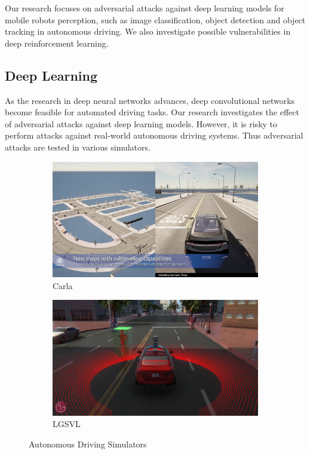 Our research focuses on adversarial attacks against deep learning models for mobile robots perception, such as image classification, object detection and object tracking in autonomous driving. We also investigate possible vulnerabilities in deep reinforcement learning.


\subsection{Deep Learning}
\label{sec:deep_robot}

As the research in deep neural networks advances, deep convolutional networks become feasible for automated driving tasks. Our research investigates the effect of adversarial attacks against deep learning models. However, it is risky to perform attacks against real-world autonomous driving systems. Thus adversarial attacks are tested in various simulators.

\begin{figure}[H]
\centering
\begin{subfigure}[b]{0.485\textwidth}
    \centering
    \includegraphics[width=\textwidth]{figures/chapter_intro/carla.jpg}
    \caption{Carla}
    \label{fig:carla}
\end{subfigure}
\hfill
\begin{subfigure}[b]{0.485\textwidth}
    \centering
    \includegraphics[width=\textwidth]{figures/chapter_intro/lgsvl.png}
    \caption{LGSVL}
    \label{fig:lvsvl}
\end{subfigure}
\hfill
\caption{Autonomous Driving Simulators}
\label{fig.simulator}
\end{figure}

